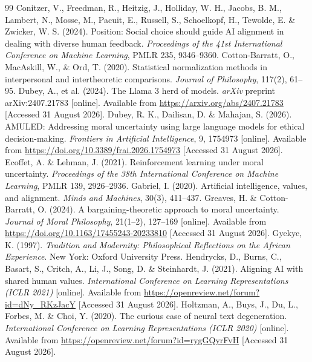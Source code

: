 \documentclass[10pt,twocolumn,a4paper]{article}
\begin{document}
\begin{thebibliography}{99}
 Conitzer, V., Freedman, R., Heitzig, J., Holliday, W. H., Jacobs, B. M., Lambert, N., Mosse, M., Pacuit, E., Russell, S., Schoelkopf, H., Tewolde, E. \& Zwicker, W. S. (2024). Position: Social choice should guide AI alignment in dealing with diverse human feedback. \textit{Proceedings of the 41st International Conference on Machine Learning}, PMLR 235, 9346--9360.
 Cotton-Barratt, O., MacAskill, W., \& Ord, T. (2020). Statistical normalization methods in interpersonal and intertheoretic comparisons. \textit{Journal of Philosophy}, 117(2), 61--95.
 Dubey, A., et al. (2024). The Llama 3 herd of models. \textit{arXiv} preprint arXiv:2407.21783 [online]. Available from \url{https://arxiv.org/abs/2407.21783} [Accessed 31 August 2026].
 Dubey, R. K., Dailisan, D. \& Mahajan, S. (2026). AMULED: Addressing moral uncertainty using large language models for ethical decision-making. \textit{Frontiers in Artificial Intelligence}, 9, 1754973 [online]. Available from \url{https://doi.org/10.3389/frai.2026.1754973} [Accessed 31 August 2026].
 Ecoffet, A. \& Lehman, J. (2021). Reinforcement learning under moral uncertainty. \textit{Proceedings of the 38th International Conference on Machine Learning}, PMLR 139, 2926--2936.
 Gabriel, I. (2020). Artificial intelligence, values, and alignment. \textit{Minds and Machines}, 30(3), 411--437.
 Greaves, H. \& Cotton-Barratt, O. (2024). A bargaining-theoretic approach to moral uncertainty. \textit{Journal of Moral Philosophy}, 21(1--2), 127--169 [online]. Available from \url{https://doi.org/10.1163/17455243-20233810} [Accessed 31 August 2026].
 Gyekye, K. (1997). \textit{Tradition and Modernity: Philosophical Reflections on the African Experience}. New York: Oxford University Press.
 Hendrycks, D., Burns, C., Basart, S., Critch, A., Li, J., Song, D. \& Steinhardt, J. (2021). Aligning AI with shared human values. \textit{International Conference on Learning Representations (ICLR 2021)} [online]. Available from \url{https://openreview.net/forum?id=dNy_RKzJacY} [Accessed 31 August 2026].
 Holtzman, A., Buys, J., Du, L., Forbes, M. \& Choi, Y. (2020). The curious case of neural text degeneration. \textit{International Conference on Learning Representations (ICLR 2020)} [online]. Available from \url{https://openreview.net/forum?id=rygGQyrFvH} [Accessed 31 August 2026].

\end{thebibliography}
\end{document}
